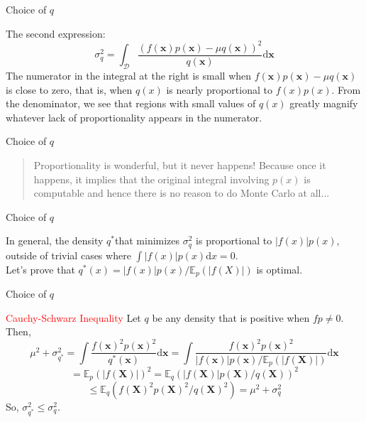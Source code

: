\begin{frame}{Choice of $q$}

The second expression:\\
\[\sigma_{q}^{2}=\int_{\mathcal{D}} \frac{(f(\boldsymbol{x}) p(\boldsymbol{x})-\mu q(\boldsymbol{x}))^{2}}{q(\boldsymbol{x})} \mathrm{d} \boldsymbol{x}\]
The numerator in the integral at the right is small when $f(\boldsymbol{x}) p(\boldsymbol{x})-\mu q(\boldsymbol{x})$ is close to zero, that is, when $q(x)$ is nearly proportional to $f(x)p(x)$. From the denominator, we see that regions with small values of $q(x)$ greatly magnify whatever lack of proportionality appears in the numerator.

\end{frame}


\begin{frame}{Choice of $q$}
\begin{quote}

Proportionality is wonderful, but it never happens! Because once it happens, it implies that the original integral involving $p(x)$ is computable and hence there is no reason to do Monte Carlo at all...

\end{quote}
\end{frame}

\begin{frame}{Choice of $q$}

In general, the density $q^{*}$that minimizes $\sigma_{q}^{2}$ is proportional to $|f(x)| p(x)$, outside of trivial cases where $\int|f(x)| p(x) \mathrm{d} x=0$.\\
Let's prove that $q^{*}(x)=|f(x)| p(x) / \mathbb{E}_{p}(|f(X)|)$ is optimal.

\end{frame}

\begin{frame}{Choice of $q$}

\textcolor{red}{Cauchy-Schwarz Inequality}
Let $q$ be any density that is positive when $f p \neq 0$. Then,\\
\[\mu^{2}+\sigma_{q^{*}}^{2}=\int \frac{f(\boldsymbol{x})^{2} p(\boldsymbol{x})^{2}}{q^{*}(\boldsymbol{x})} \mathrm{d} \boldsymbol{x}=\int \frac{f(\boldsymbol{x})^{2} p(\boldsymbol{x})^{2}}{|f(\boldsymbol{x})| p(\boldsymbol{x}) / \mathbb{E}_{p}(|f(\boldsymbol{X})|)} \mathrm{d} \boldsymbol{x}\]
\[=\mathbb{E}_{p}(|f(\boldsymbol{X})|)^{2}=\mathbb{E}_{q}(|f(\boldsymbol{X})| p(\boldsymbol{X}) / q(\boldsymbol{X}))^{2}\]
\[\leqslant \mathbb{E}_{q}\left(f(\boldsymbol{X})^{2} p(\boldsymbol{X})^{2} / q(\boldsymbol{X})^{2}\right)=\mu^{2}+\sigma_{q}^{2}\]
So, $\sigma_{q^{*}}^{2} \leqslant \sigma_{q}^{2}$.

\end{frame}

